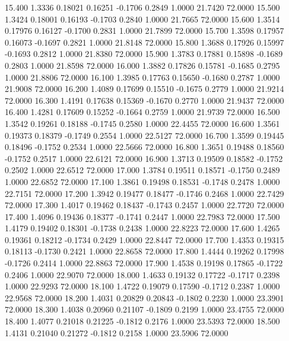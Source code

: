   15.400   1.3336   0.18021   0.16251  -0.1706   0.2849   1.0000  21.7420  72.0000
  15.500   1.3424   0.18001   0.16193  -0.1703   0.2840   1.0000  21.7665  72.0000
  15.600   1.3514   0.17976   0.16127  -0.1700   0.2831   1.0000  21.7899  72.0000
  15.700   1.3598   0.17957   0.16073  -0.1697   0.2821   1.0000  21.8148  72.0000
  15.800   1.3688   0.17926   0.15997  -0.1693   0.2812   1.0000  21.8380  72.0000
  15.900   1.3783   0.17881   0.15898  -0.1689   0.2803   1.0000  21.8598  72.0000
  16.000   1.3882   0.17826   0.15781  -0.1685   0.2795   1.0000  21.8806  72.0000
  16.100   1.3985   0.17763   0.15650  -0.1680   0.2787   1.0000  21.9008  72.0000
  16.200   1.4089   0.17699   0.15510  -0.1675   0.2779   1.0000  21.9214  72.0000
  16.300   1.4191   0.17638   0.15369  -0.1670   0.2770   1.0000  21.9437  72.0000
  16.400   1.4281   0.17609   0.15252  -0.1664   0.2759   1.0000  21.9739  72.0000
  16.500   1.3542   0.19261   0.18188  -0.1745   0.2580   1.0000  22.4455  72.0000
  16.600   1.3561   0.19373   0.18379  -0.1749   0.2554   1.0000  22.5127  72.0000
  16.700   1.3599   0.19445   0.18496  -0.1752   0.2534   1.0000  22.5666  72.0000
  16.800   1.3651   0.19488   0.18560  -0.1752   0.2517   1.0000  22.6121  72.0000
  16.900   1.3713   0.19509   0.18582  -0.1752   0.2502   1.0000  22.6512  72.0000
  17.000   1.3784   0.19511   0.18571  -0.1750   0.2489   1.0000  22.6852  72.0000
  17.100   1.3861   0.19498   0.18531  -0.1748   0.2478   1.0000  22.7151  72.0000
  17.200   1.3942   0.19477   0.18477  -0.1746   0.2468   1.0000  22.7429  72.0000
  17.300   1.4017   0.19462   0.18437  -0.1743   0.2457   1.0000  22.7720  72.0000
  17.400   1.4096   0.19436   0.18377  -0.1741   0.2447   1.0000  22.7983  72.0000
  17.500   1.4179   0.19402   0.18301  -0.1738   0.2438   1.0000  22.8223  72.0000
  17.600   1.4265   0.19361   0.18212  -0.1734   0.2429   1.0000  22.8447  72.0000
  17.700   1.4353   0.19315   0.18113  -0.1730   0.2421   1.0000  22.8658  72.0000
  17.800   1.4444   0.19262   0.17998  -0.1726   0.2414   1.0000  22.8863  72.0000
  17.900   1.4538   0.19198   0.17865  -0.1722   0.2406   1.0000  22.9070  72.0000
  18.000   1.4633   0.19132   0.17722  -0.1717   0.2398   1.0000  22.9293  72.0000
  18.100   1.4722   0.19079   0.17590  -0.1712   0.2387   1.0000  22.9568  72.0000
  18.200   1.4031   0.20829   0.20843  -0.1802   0.2230   1.0000  23.3901  72.0000
  18.300   1.4038   0.20960   0.21107  -0.1809   0.2199   1.0000  23.4755  72.0000
  18.400   1.4077   0.21018   0.21225  -0.1812   0.2176   1.0000  23.5393  72.0000
  18.500   1.4131   0.21040   0.21272  -0.1812   0.2158   1.0000  23.5906  72.0000
